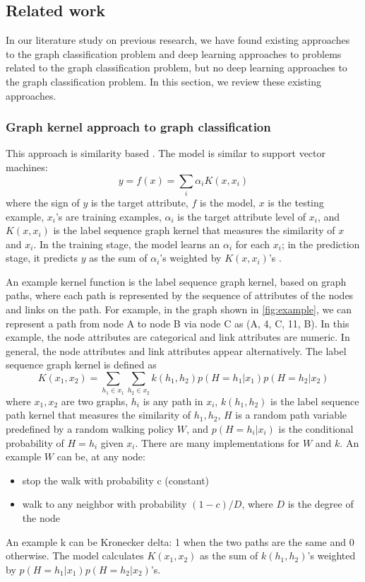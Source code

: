 \documentclass{article}
\begin{document}
\subsection{Related work}
In our literature study on previous research,
we have found existing approaches to the graph classification problem
and deep learning approaches to problems related to the graph classification problem,
but no deep learning approaches to the graph classification problem.
In this section, we review these existing approaches.

\subsubsection{Graph kernel approach to graph classification}
This approach is similarity based \cite{kashima2003marginalized}.
The model is similar to support vector machines:
\[ y = f(x) = \sum_{i} \alpha_i K(x, x_i) \]
where the sign of $ y $ is the target attribute, $ f $ is the model,
$ x $ is the testing example,
$ x_i $'s are training examples,
$ \alpha_i $ is the target attribute level of $ x_i $,
and $ K(x, x_i) $ is the label sequence graph kernel
that measures the similarity of $ x $ and $ x_i $.
In the training stage,
the model learns an $ \alpha_i $ for each $ x_i $;
in the prediction stage,
it predicts $ y $ as 
the sum of $ \alpha_i $'s weighted by $ K(x, x_i) $'s \cite{scholkopf2001learning}.

An example kernel function is the label sequence graph kernel,
based on graph paths,
where each path is represented by the sequence of attributes of the nodes and links
on the path.
For example, in the graph shown in \autoref{fig:example},
we can represent a path from node A to node B via node C as (A, 4, C, 11, B).
In this example, the node attributes are categorical and link attributes are numeric.
In general, the node attributes and link attributes appear alternatively.
The label sequence graph kernel is defined as
\[ K(x_1, x_2) =
\sum_{h_1 \in x_1} \sum_{h_2 \in x_2} 
k(h_1, h_2) p(H = h_1 | x_1) p(H = h_2 | x_2) \]
where $ x_1, x_2 $ are two graphs,
$ h_i $ is any path in $ x_i $,
$ k(h_1, h_2) $ is the label sequence path kernel
that measures the similarity of $ h_1, h_2 $,
$ H $ is a random path variable predefined by a random walking policy $ W $, and
$ p(H = h_i | x_i) $ is the conditional probability of $ H = h_i $ given $ x_i $.
There are many implementations for $ W $ and $ k $.
An example $ W $ can be, at any node:
\begin{itemize}
	\item stop the walk with probability c (constant)
	\item walk to any neighbor with probability $ (1 - c) / D $,
	where $ D $ is the degree of the node
\end{itemize}
An example k can be Kronecker delta: 1 when the two paths are the same and 0 otherwise.
The model calculates $ K(x_1, x_2) $ as
the sum of $ k(h_1, h_2) $'s weighted by $ p(H = h_1 | x_1) p(H = h_2 | x_2) $'s.
\end{document}
